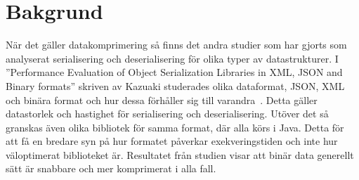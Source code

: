 \section{Bakgrund}
\label{sec:tim-background}
När det gäller datakomprimering så finns det andra studier som har gjorts som analyserat serialisering och deserialisering för olika typer av datastrukturer. I ''Performance Evaluation of Object Serialization Libraries in XML, JSON and Binary formats'' skriven av Kazuaki studerades olika dataformat, JSON, XML och binära format och hur dessa förhåller sig till varandra~\cite{serialization}. Detta gäller datastorlek och hastighet för serialisering och deserialisering. Utöver det så granskas även olika bibliotek för samma format, där alla körs i Java. Detta för att få en bredare syn på hur formatet påverkar exekveringstiden och inte hur väloptimerat biblioteket är. Resultatet från studien visar att binär data generellt sätt är snabbare och mer komprimerat i alla fall.
